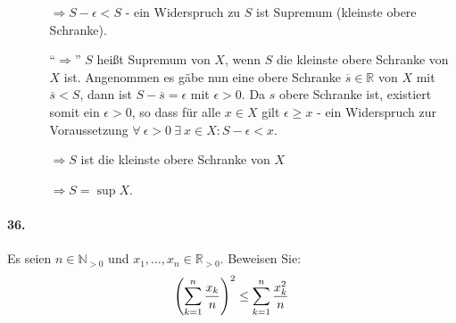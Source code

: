 \documentclass{scrreprt}
\begin{document}
\begin{enumerate}[(a)]
\begin{itemize}
    $\Rightarrow S - \epsilon < S$ - ein Widerspruch zu $S$ ist Supremum
    (kleinste obere Schranke).

  \item[``$\Rightarrow$''] $S$ heißt Supremum von $X$, wenn $S$ die kleinste
    obere Schranke von $X$ ist.
    Angenommen es gäbe nun eine obere Schranke $\overline{s} \in \mathbb{R}$
    von $X$ mit $\overline{s} < S$, dann ist $S - \overline{s} = \epsilon$ mit
    $\epsilon > 0$.
    Da $s$ obere Schranke ist, existiert somit ein $\epsilon > 0$, so dass
    für alle $x \in X$ gilt $\epsilon \geq x$ - ein Widerspruch zur
    Voraussetzung
    $\forall \: \epsilon > 0 \: \exists \: x \in X \colon S - \epsilon < x$.

    $\Rightarrow S$ ist die kleinste obere Schranke von $X$

    $\Rightarrow S = \sup X$.
  \end{itemize}
\end{enumerate}

\newpage
\paragraph{36.} Es seien $n \in \mathbb{N}_{> 0}$ und
$x_1, \ldots, x_n \in \mathbb{R}_{> 0}$.
Beweisen Sie:
\[
  \qty(\sum_{k = 1}^n \frac{x_k}{n})^2 \leq \sum_{k = 1}^n \frac{x_k^2}{n}
\]
\end{document}
